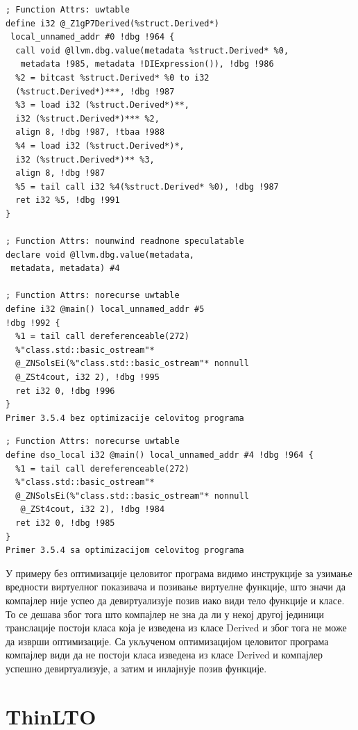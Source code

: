 \documentclass[12pt,oneside]{memoir}
\begin{document}
\begin{lstlisting}[frame=single]
; Function Attrs: uwtable
define i32 @_Z1gP7Derived(%struct.Derived*)
 local_unnamed_addr #0 !dbg !964 {
  call void @llvm.dbg.value(metadata %struct.Derived* %0,
   metadata !985, metadata !DIExpression()), !dbg !986
  %2 = bitcast %struct.Derived* %0 to i32 
  (%struct.Derived*)***, !dbg !987
  %3 = load i32 (%struct.Derived*)**, 
  i32 (%struct.Derived*)*** %2, 
  align 8, !dbg !987, !tbaa !988
  %4 = load i32 (%struct.Derived*)*, 
  i32 (%struct.Derived*)** %3, 
  align 8, !dbg !987
  %5 = tail call i32 %4(%struct.Derived* %0), !dbg !987
  ret i32 %5, !dbg !991
}

; Function Attrs: nounwind readnone speculatable
declare void @llvm.dbg.value(metadata,
 metadata, metadata) #4

; Function Attrs: norecurse uwtable
define i32 @main() local_unnamed_addr #5 
!dbg !992 {
  %1 = tail call dereferenceable(272) 
  %"class.std::basic_ostream"* 
  @_ZNSolsEi(%"class.std::basic_ostream"* nonnull 
  @_ZSt4cout, i32 2), !dbg !995
  ret i32 0, !dbg !996
}
Primer 3.5.4 bez optimizacije celovitog programa
\end{lstlisting}

\begin{lstlisting}[frame=single]
; Function Attrs: norecurse uwtable
define dso_local i32 @main() local_unnamed_addr #4 !dbg !964 {
  %1 = tail call dereferenceable(272) 
  %"class.std::basic_ostream"* 
  @_ZNSolsEi(%"class.std::basic_ostream"* nonnull
   @_ZSt4cout, i32 2), !dbg !984
  ret i32 0, !dbg !985
}
Primer 3.5.4 sa optimizacijom celovitog programa
\end{lstlisting}

У примеру без оптимизације целовитог програма видимо инструкције за узимање вредности
виртуелног показивача и позивање виртуелне функције, што значи да компајлер није успео
да девиртуализује позив иако види тело функције и класе.
То се дешава због тога што компајлер не зна да ли у некој другој јединици транслације
постоји класа која је изведена из класе Derived и због тога не може да изврши
оптимизације.
Са укљученом оптимизацијом целовитог програма компајлер види да не постоји класа
изведена из класе Derived и компајлер успешно девиртуализује, а затим и инлајнује
позив функције. 
 
 \chapter{ThinLTO}
 
\end{document}
